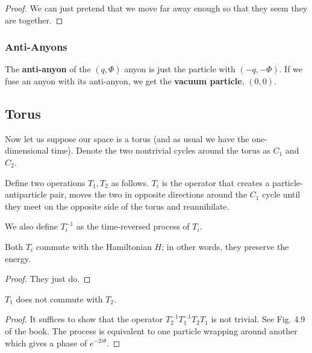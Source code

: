 \begin{proof}
  We can just pretend that we move far away enough so that they seem they are together.
\end{proof}



\subsubsection{Anti-Anyons}

The \textbf{anti-anyon} of the $(q, \Phi)$ anyon is just the particle with $(-q, -\Phi)$. If we fuse an anyon with its anti-anyon, we get the \textbf{vacuum particle}, $(0,0)$.


\subsection{Torus}

Now let us suppose our space is a torus (and as usual we have the one-dimensional time).
Denote the two nontrivial cycles around the torus as $C_1$ and $C_2$.   

Define two operations $T_1, T_2$ as follows. $T_i$ is the operator that creates a particle-antiparticle pair, moves the two in opposite directions  around the $C_1$ cycle until they meet on the opposite side of the torus and reannihilate. 

We also define $T_i ^{-1}$ as the time-reversed process of $T_i$.


\begin{proposition}
  Both $T_i$ commute with the Hamiltonian $H$; in other words, they preserve the energy. 
\end{proposition}
\begin{proof}
  They just do.
\end{proof}



\begin{proposition}
  $T_1$ does not commute with $T_2$.  
\end{proposition}

\begin{proof}
  It suffices to show that the operator $T_2  ^{-1} T_1 ^{-1} T_2 T_1$ is not trivial. See Fig. 4.9 of the book. The process is equivalent to one particle wrapping around another which gives a phase of $e^{-2 i \theta}$.   
\end{proof}




